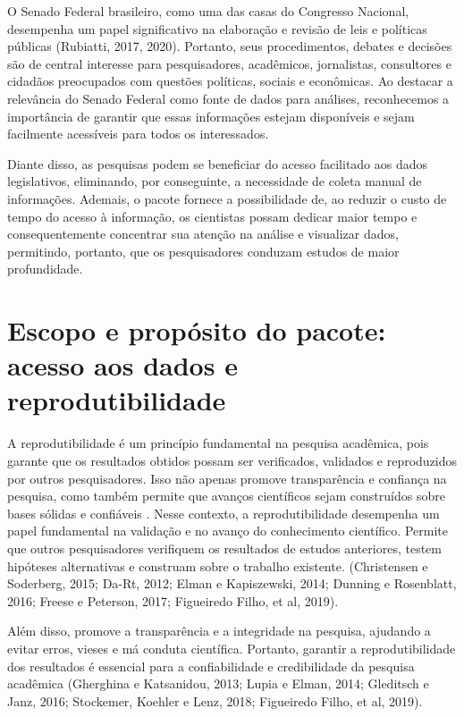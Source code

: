 \documentclass{article}
\begin{document}
O Senado Federal brasileiro, como uma das casas do Congresso Nacional,
desempenha um papel significativo na elaboração e revisão de leis e
políticas públicas (Rubiatti, 2017, 2020). Portanto, seus procedimentos,
debates e decisões são de central interesse para pesquisadores,
acadêmicos, jornalistas, consultores e cidadãos preocupados com questões
políticas, sociais e econômicas. Ao destacar a relevância do Senado
Federal como fonte de dados para análises, reconhecemos a importância de
garantir que essas informações estejam disponíveis e sejam facilmente
acessíveis para todos os interessados.

Diante disso, as pesquisas podem se beneficiar do acesso facilitado aos
dados legislativos, eliminando, por conseguinte, a necessidade de coleta
manual de informações. Ademais, o pacote fornece a possibilidade de, ao
reduzir o custo de tempo do acesso à informação, os cientistas possam
dedicar maior tempo e consequentemente concentrar sua atenção na análise
e visualizar dados, permitindo, portanto, que os pesquisadores conduzam
estudos de maior profundidade.

\hypertarget{escopo-e-propuxf3sito-do-pacote-acesso-aos-dados-e-reprodutibilidade}{%
\section{Escopo e propósito do pacote: acesso aos dados e
reprodutibilidade}\label{escopo-e-propuxf3sito-do-pacote-acesso-aos-dados-e-reprodutibilidade}}

A reprodutibilidade é um princípio fundamental na pesquisa acadêmica,
pois garante que os resultados obtidos possam ser verificados, validados
e reproduzidos por outros pesquisadores. Isso não apenas promove
transparência e confiança na pesquisa, como também permite que avanços
científicos sejam construídos sobre bases sólidas e confiáveis . Nesse
contexto, a reprodutibilidade desempenha um papel fundamental na
validação e no avanço do conhecimento científico. Permite que outros
pesquisadores verifiquem os resultados de estudos anteriores, testem
hipóteses alternativas e construam sobre o trabalho existente.
(Christensen e Soderberg, 2015; Da-Rt, 2012; Elman e Kapiszewski, 2014;
Dunning e Rosenblatt, 2016; Freese e Peterson, 2017; Figueiredo Filho,
et al, 2019).

Além disso, promove a transparência e a integridade na pesquisa,
ajudando a evitar erros, vieses e má conduta científica. Portanto,
garantir a reprodutibilidade dos resultados é essencial para a
confiabilidade e credibilidade da pesquisa acadêmica (Gherghina e
Katsanidou, 2013; Lupia e Elman, 2014; Gleditsch e Janz, 2016;
Stockemer, Koehler e Lenz, 2018; Figueiredo Filho, et al, 2019).
\end{document}
